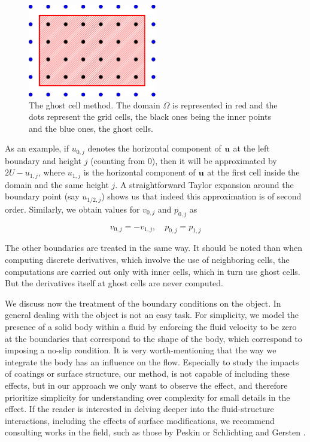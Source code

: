 \begin{figure}[h]
  \centering
  \includegraphics[width=0.5\textwidth]{0_graphics/methods/grid.pdf}
  \caption{The ghost cell method. The domain $\Omega$ is represented in red and the dots represent the grid cells, the black ones being the inner points and the blue ones, the ghost cells.}
  \label{fig: ghostCells}
\end{figure}

As an example, if $u_{0,j}$ denotes the horizontal component of $\boldsymbol{\mathrm{u}}$ at the left boundary and height $j$ (counting from 0), then it will be approximated by $2U-u_{1,j}$, where $u_{1,j}$ is the horizontal component of $\boldsymbol{\mathrm{u}}$ at the first cell inside the domain and the same height $j$. A straightforward Taylor expansion around the boundary point (say $u_{1/2,j}$) shows us that indeed this approximation is of second order.
Similarly, we obtain values for $v_{0,j}$ and $p_{0,j}$ as

$$
  v_{0,j} = -v_{1,j}, \quad p_{0,j} = p_{1,j}
$$

The other boundaries are treated in the same way. It should be noted than when computing discrete derivatives, which involve the use of neighboring cells, the computations are carried out only with inner cells, which in turn use ghost cells. But the derivatives itself at ghost cells are never computed.

We discuss now the treatment of the boundary conditions on the object. In general dealing with the object is not an easy task. For simplicity, we model the presence of a solid body within a fluid by enforcing the fluid velocity to be zero at the boundaries that correspond to the shape of the body, which correspond to imposing a no-slip condition.
It is very worth-mentioning that the way we integrate the body has an influence on the flow. Especially to study the impacts of coatings or surface structure, our method, is not capable of including these effects, but in our approach we only want to observe the effect, and therefore prioritize simplicity for understanding over complexity for small details in the effect. If the reader is interested in delving deeper into the fluid-structure interactions, including the effects of surface modifications, we recommend consulting works in the field, such as those by Peskin \cite{Peskin1977ImmersedBM} or Schlichting and Gersten \cite{Schlichting2000BoundaryLayerT}.

